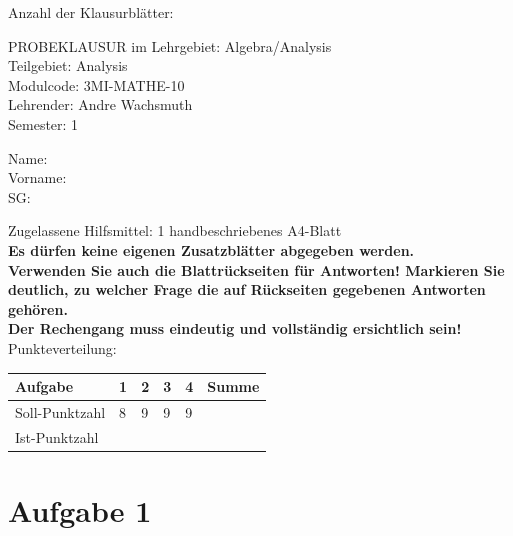 \documentclass[12pt]{article}
\begin{document}
\thispagestyle{firstpage}

\begin{flushright}
Anzahl der Klausurblätter: \pageref*{LastTask}
\end{flushright}

PROBEKLAUSUR im Lehrgebiet: Algebra/Analysis\\

Teilgebiet: Analysis \\

Modulcode: 3MI-MATHE-10 \\

Lehrender: Andre Wachsmuth \\

Semester: 1 \\

\begin{vwcol}[widths={0.4,0.4,0.2},sep=0cm, justify=flush,rule=0pt,indent=4em]
Name:\\
Vorname:\\
SG:
\end{vwcol}

\bigskip
\bigskip
\bigskip

Zugelassene Hilfsmittel: 1 handbeschriebenes A4-Blatt \\

\textbf{Es dürfen keine eigenen Zusatzblätter abgegeben werden.} \\

\textbf{Verwenden Sie auch die Blattrückseiten für Antworten! Markieren Sie deutlich, zu welcher Frage die auf Rückseiten gegebenen Antworten gehören.} \\

\textbf {Der Rechengang muss eindeutig und vollständig ersichtlich sein!} \\

Punkteverteilung:

\bigskip

\begin{tabularx}{\textwidth}{l|Y|Y|Y|Y|Y}
Aufgabe        & 1 & 2 & 3 & 4  & Summe \\ [1ex] \hline
Soll-Punktzahl & 8 & 9 & 9 & 9  &       \\ [3ex]
Ist-Punktzahl  &   &   &   &    &       \\ [3ex]
\end{tabularx}

\newpage
\section* {Aufgabe 1}
\end{document}
